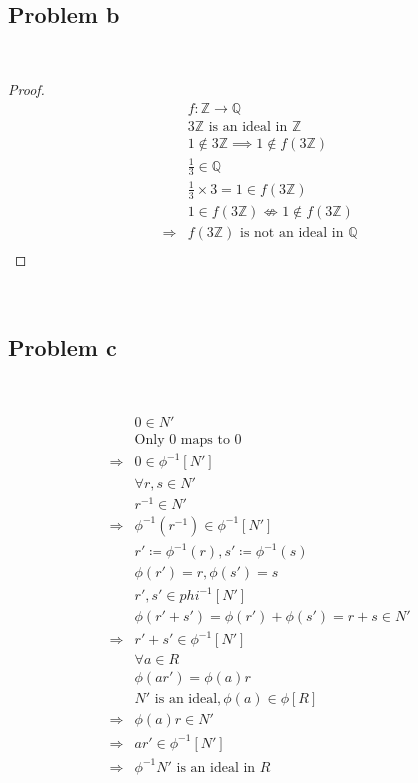 \documentclass{article}
\begin{document}
~

\subsection*{Problem b}

~

\begin{proof}
    \begin{align*}
        &f:\mathbb{Z} \rightarrow \mathbb{Q} \\
        &3\mathbb{Z} \text{ is an ideal in }\mathbb{Z} \\
        &1\notin 3\mathbb{Z} \implies 1\notin f(3\mathbb{Z} )\\
        &\frac{1}{3}\in\mathbb{Q} \\
        &\frac{1}{3}\times3 =1\in f(3\mathbb{Z} )\\
        &1\in f(3\mathbb{Z} )\nLeftrightarrow1\notin f(3\mathbb{Z} )\\
        \Rightarrow&f(3\mathbb{Z} )\text{ is not an ideal in }\mathbb{Q} \\
    \end{align*}
\end{proof}

~

\subsection*{Problem c}

~

\begin{align*}
    &0\in N'\\
    &\text{Only }0\text{ maps to }0\\
    \Rightarrow&0\in \phi^{-1}[N']\\
    &\forall r,s\in N'\\
    &r^{-1}\in N'\\
    \Rightarrow&\phi^{-1}(r^{-1})\in \phi^{-1}[N']\\
    &r'\coloneqq \phi^{-1}(r),s'\coloneqq \phi^{-1}(s)\\
    &\phi(r')=r,\phi(s')=s\\
    &r',s'\in phi^{-1}[N']\\
    &\phi(r'+s')=\phi(r')+\phi(s')=r+s\in N'\\
    \Rightarrow&r'+s'\in\phi^{-1}[N']\\
    &\forall a\in R\\
    &\phi(ar')=\phi(a)r\\
    &N'\text{ is an ideal},\phi(a)\in \phi[R]\\
    \Rightarrow&\phi(a)r\in N'\\
    \Rightarrow&ar'\in \phi^{-1}[N']\\
    \Rightarrow&\phi^{-1}N'\text{ is an ideal in }R\\
\end{align*}
\end{document}

